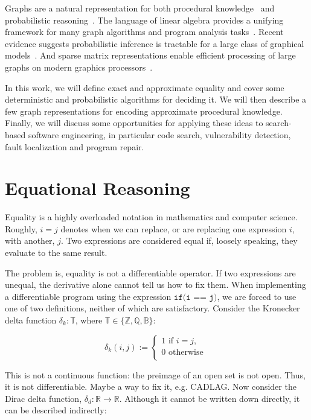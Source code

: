 \documentclass[11pt]{article}
\begin{document}
    Graphs are a natural representation for both procedural knowledge~\citep{allamanis2017learning} and probabilistic reasoning~\citep{pearl2014probabilistic}. The language of linear algebra provides a unifying framework for many graph algorithms and program analysis tasks~\citep{kepner2011graph}. Recent evidence suggests probabilistic inference is tractable for a large class of graphical models~\citep{choi2020probabilistic}. And sparse matrix representations enable efficient processing of large graphs on modern graphics processors~\citep{kepner2016mathematical}.

    In this work, we will define exact and approximate equality and cover some deterministic and probabilistic algorithms for deciding it. We will then describe a few graph representations for encoding approximate procedural knowledge. Finally, we will discuss some opportunities for applying these ideas to search-based software engineering, in particular code search, vulnerability detection, fault localization and program repair.

    \section{Equational Reasoning}\label{sec:definitions}

    Equality is a highly overloaded notation in mathematics and computer science. Roughly, $i = j$ denotes when we can replace, or are replacing one expression $i$, with another, $j$. Two expressions are considered equal if, loosely speaking, they evaluate to the same result.

    The problem is, equality is not a differentiable operator. If two expressions are unequal, the derivative alone cannot tell us how to fix them. When implementing a differentiable program using the expression $\texttt{if(i == j)}$, we are forced to use one of two definitions, neither of which are satisfactory. Consider the Kronecker delta function $\delta_k: \mathbb{T}$, where $\mathbb{T} \in \{\mathbb{Z, Q, B}\}$:

    $$
    \delta_k(i, j) :=
    \begin{cases}
        1 \text{ if } i = j, \\
        0 \text{ otherwise }\\
    \end{cases}
    $$

    This is not a continuous function: the preimage of an open set is not open. Thus, it is not differentiable. Maybe a way to fix it, e.g. CADLAG. Now consider the Dirac delta function, $\delta_d: \mathbb{R} \rightarrow \mathbb{R}$. Although it cannot be written down directly, it can be described indirectly:
\end{document}
